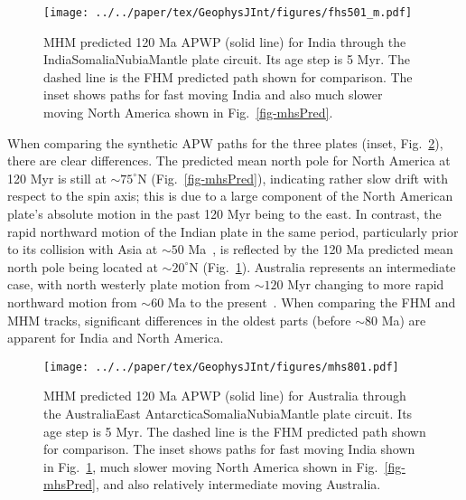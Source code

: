 \begin{figure}[!ht]
\centering
\texttt{[image: ../../paper/tex/GeophysJInt/figures/fhs501\_m.pdf]}
\caption[120 Ma MHM vs FHM predicted APWP of India]{MHM predicted
120 Ma APWP (solid line) for India through the
India\textendash{}Somalia\textendash{}Nubia\textendash{}Mantle plate circuit.
Its age step is 5 Myr. The dashed line is the FHM predicted path shown for
comparison. The inset shows paths for fast moving India and also much slower
moving North America shown in Fig.~\ref{fig-mhsPred}.}\label{fig-mhsPred501}
\end{figure}

When comparing the synthetic APW paths for the three plates (inset,
Fig.~\ref{fig-mhsPred801}), there are clear differences. The predicted mean
north pole for North America at 120 Myr is still at ${\sim}75^{\circ}$N
(Fig.~\ref{fig-mhsPred}), indicating rather slow drift with respect to the spin
axis; this is due to a large component of the North American plate's absolute
motion in the past 120 Myr being to the east. In contrast, the rapid northward
motion of the Indian plate in the same period, particularly prior to its
collision with Asia at ${\sim}50$ Ma~\citep{N10}, is reflected by
the 120 Ma predicted mean north pole being located at ${\sim}20^{\circ}$N
(Fig.~\ref{fig-mhsPred501}). Australia represents an intermediate case, with
north westerly plate motion from ${\sim}120$ Myr changing to more
rapid northward motion from ${\sim}60$ Ma to the present~\citep{W07}.
When comparing the FHM and MHM tracks, significant differences in the oldest
parts (before ${\sim}80$ Ma) are apparent for India and North America.

\begin{figure}[!ht]
\centering
\texttt{[image: ../../paper/tex/GeophysJInt/figures/mhs801.pdf]}
\caption[120 Ma MHM vs FHM predicted APWP of Australia]{MHM
predicted 120 Ma APWP (solid line) for Australia through the
Australia\textendash{}East
Antarctica\textendash{}Somalia\textendash{}Nubia\textendash{}Mantle plate
circuit. Its age step is 5 Myr. The dashed line is the FHM predicted path shown
for comparison. The inset shows paths for fast moving India shown in
Fig.~\ref{fig-mhsPred501}, much slower moving North America shown in
Fig.~\ref{fig-mhsPred}, and also relatively intermediate moving
Australia.}\label{fig-mhsPred801}
\end{figure}

